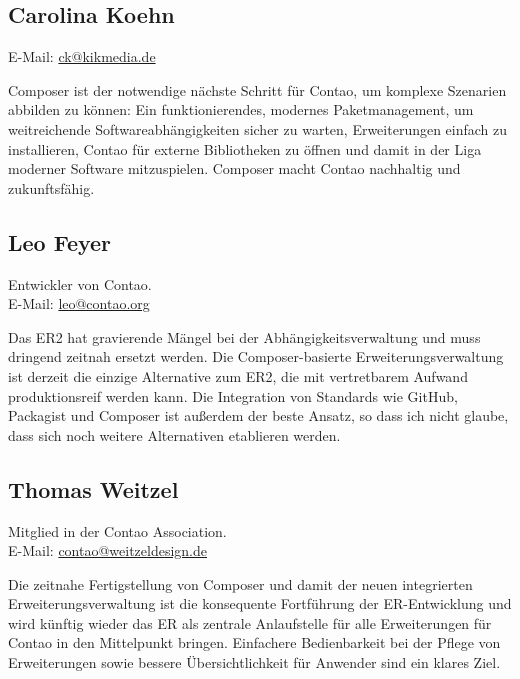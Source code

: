 \documentclass[
paper=a4,
draft=false,%
fontsize=10pt%
]{scrartcl}
\begin{document}
\subsection*{Carolina  Koehn}

E-Mail: \href{mailto:ck@kikmedia.de}{ck@kikmedia.de}

Composer ist der notwendige nächste Schritt für Contao, um komplexe Szenarien abbilden zu können: Ein funktionierendes, modernes  Paketmanagement, um weitreichende Softwareabhängigkeiten sicher zu warten, Erweiterungen einfach zu installieren, Contao für externe Bibliotheken zu öffnen und damit in der Liga moderner Software mitzuspielen. Composer macht Contao nachhaltig und zukunftsfähig.

\subsection*{Leo  Feyer}

Entwickler von Contao.\\
E-Mail: \href{mailto:leo@contao.org}{leo@contao.org}

Das ER2 hat gravierende Mängel bei der Abhängigkeitsverwaltung und muss dringend zeitnah ersetzt werden. Die Composer-basierte Erweiterungsverwaltung ist derzeit die einzige Alternative zum ER2, die mit vertretbarem Aufwand produktionsreif werden kann. Die Integration von Standards wie GitHub, Packagist und Composer ist außerdem der beste Ansatz, so dass ich nicht glaube, dass sich noch weitere Alternativen etablieren werden.

\subsection*{Thomas  Weitzel}

Mitglied in der Contao Association.\\
E-Mail: \href{mailto:contao@weitzeldesign.de}{contao@weitzeldesign.de}

Die zeitnahe Fertigstellung von Composer und damit der neuen integrierten Erweiterungsverwaltung ist die konsequente Fortführung der ER-Entwicklung und wird künftig wieder das ER als zentrale Anlaufstelle für alle Erweiterungen für Contao in den Mittelpunkt bringen. Einfachere Bedienbarkeit bei der Pflege von Erweiterungen sowie bessere Übersichtlichkeit für Anwender sind ein klares Ziel.

\newpage

%
%
\end{document}

